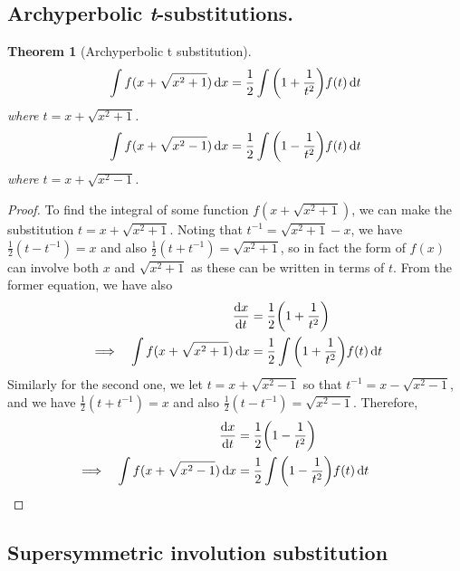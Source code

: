 \documentclass[fleqn,a4paper,11pt]{article}
\newtheorem{theorem}{Theorem}[section]
\begin{document}
    \subsection{Archyperbolic \textit t-substitutions.}

    \begin{theorem}[Archyperbolic t substitution]
    \begin{equation*}
    \int f(x + \sqrt{x^2 + 1}) \dd{x}
        = \frac 12 \int \pqty{1 + \frac 1{t^2}}f(t) \dd{t}
    \end{equation*}
    where \(t = x + \sqrt{x^2 + 1}\).
    \begin{equation*}
    \int f(x + \sqrt{x^2 - 1}) \dd{x}
        = \frac 12 \int \pqty{1 - \frac 1{t^2}}f(t) \dd{t}
    \end{equation*}
    where \(t = x + \sqrt{x^2 - 1}\).
    \end{theorem}
    \begin{proof}
    To find the integral of some function \(f(x + \sqrt{x^2 + 1})\), we can make
    the substitution \(t = x + \sqrt{x^2 + 1}\). Noting that
    \(t^{-1} = \sqrt{x^2 + 1} - x\), we have \(\frac 12(t - t^{-1}) = x\)
    and also \(\frac 12(t + t^{-1}) = \sqrt{x^2 + 1}\), so in fact the form of
    \(f(x)\) can involve both \(x\) and \(\sqrt{x^2 + 1}\) as these can be
    written in terms of \(t\). From the former equation, we have also
    \begin{alignat*}{2}
    && \dv{x}{t} &= \frac 12\pqty{1 + \frac 1{t^2}} \\
    &\implies& \int f(x + \sqrt{x^2 + 1}) \dd{x}
        &= \frac 12 \int \pqty{1 + \frac 1{t^2}}f(t) \dd{t}
    \end{alignat*}
    Similarly for the second one, we let \(t = x + \sqrt{x^2 - 1}\) so that
    \(t^{-1} = x - \sqrt{x^2 - 1}\), and we have \(\frac 12(t + t^{-1}) = x\)
    and also \(\frac 12(t - t^{-1}) = \sqrt{x^2 - 1}\). Therefore,
    \begin{alignat*}{2}
    && \dv{x}{t} &= \frac 12\pqty{1 - \frac 1{t^2}} \\
    &\implies& \int f(x + \sqrt{x^2 - 1}) \dd{x}
        &= \frac 12 \int \pqty{1 - \frac 1{t^2}}f(t) \dd{t} \tag*{\qedhere}
    \end{alignat*}
    \end{proof}

    \subsection{Supersymmetric involution substitution}
\end{document}

